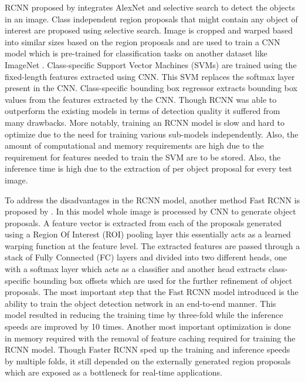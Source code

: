     RCNN proposed by \citet{Girshick2014} integrates AlexNet \cite{AlexNet2012} and selective search \cite{uijlings2013} to detect the objects in an image. Class independent region proposals that might contain any object of interest are proposed using selective search. Image is cropped and warped based into similar sizes based on the region proposals and are used to train a CNN model which is pre-trained for classification tasks on another dataset like ImageNet \cite{imagenet}. Class-specific Support Vector Machines (SVMs) are trained using the fixed-length features extracted using CNN. This SVM replaces the softmax layer present in the CNN. Class-specific bounding box regressor extracts bounding box values from the features extracted by the CNN. Though RCNN was able to outperform the existing models in terms of detection quality it suffered from many drawbacks. More notably, training an RCNN model is slow and hard to optimize due to the need for training various sub-models independently. Also, the amount of computational and memory requirements are high due to the requirement for features needed to train the SVM are to be stored. Also, the inference time is high due to the extraction of per object proposal for every test image.
    
    
    To address the disadvantages in the RCNN model, another method Fast RCNN is proposed by \citet{Girshick2015}. In this model whole image is processed by CNN to generate object proposals. A feature vector is extracted from each of the proposals generated using a Region Of Interest (ROI) pooling layer this essentially acts as a learned warping function at the feature level. The extracted features are passed through a stack of Fully Connected (FC) layers and divided into two different heads, one with a softmax layer which acts as a classifier and another head extracts class-specific bounding box offsets which are used for the further refinement of object proposals. The most important step that the Fast RCNN model introduced is the ability to train the object detection network in an end-to-end manner. This model resulted in reducing the training time by three-fold while the inference speeds are improved by 10 times. Another most important optimization is done in memory required with the removal of feature caching required for training the RCNN model. Though Faster RCNN sped up the training and inference speeds by multiple folds, it still depended on the externally generated region proposals which are exposed as a bottleneck for real-time applications.
    
